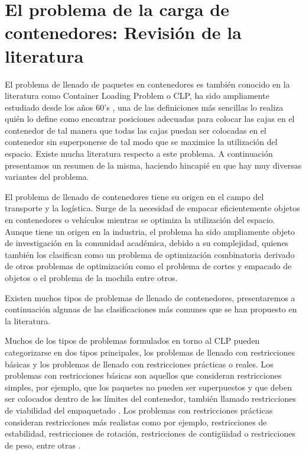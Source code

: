\documentclass[openany]{article}
\begin{document}
\section{El problema de la carga de contenedores: Revisión de la literatura}

El problema de llenado de paquetes en contenedores es también conocido en la literatura como Container Loading Problem o CLP, ha sido ampliamente estudiado desde los años 60's \parencite{barnett1967exact}, una de las definiciones más sencillas lo realiza \textcite{GEORGE1980147} quién lo define como encontrar posiciones adecuadas para colocar las cajas en el contenedor de tal manera que todas las cajas puedan ser colocadas en el contenedor sin superponerse de tal modo que se maximice la utilización del espacio. Existe mucha literatura respecto a este problema. A continuación presentamos un resumen de la misma, haciendo hincapié en que hay muy diversas variantes del problema.

El problema de llenado de contenedores tiene su origen en el campo del transporte y la logística. Surge de la necesidad de empacar eficientemente objetos en contenedores o vehículos mientras se optimiza la utilización del espacio. Aunque tiene un origen en la industria, el problema ha sido ampliamente objeto de investigación en la comunidad académica, debido a su complejidad, quienes también los clasifican como un problema de optimización combinatoria derivado de otros problemas de optimización como el problema de cortes y empacado de objetos \parencite{Alvarez-Valdes2018} o el problema de la mochila \textcite{DEQUEIROZ2012200} entre otros.

Existen muchos tipos de problemas de llenado de contenedores, presentaremos a continuación algunas de las clasificaciones más comunes que se han propuesto en la literatura.

Muchos de los tipos de problemas formulados en torno al CLP pueden categorizarse en dos tipos principales, los problemas de llenado con restricciones básicas y los problemas de llenado con restricciones prácticas o reales. Los problemas con restricciones básicas son aquellos que consideran restricciones simples, por ejemplo, que los paquetes no pueden ser superpuestos y que deben ser colocados dentro de los límites del contenedor, también llamado restricciones de viabilidad del empaquetado \parencite{scheithauer2017introduction}. Los problemas con restricciones prácticas consideran restricciones más realistas como por ejemplo, restricciones de estabilidad, restricciones de rotación, restricciones de contigüidad o restricciones de peso, entre otras \parencite{KURPEL202087}.
\end{document}
